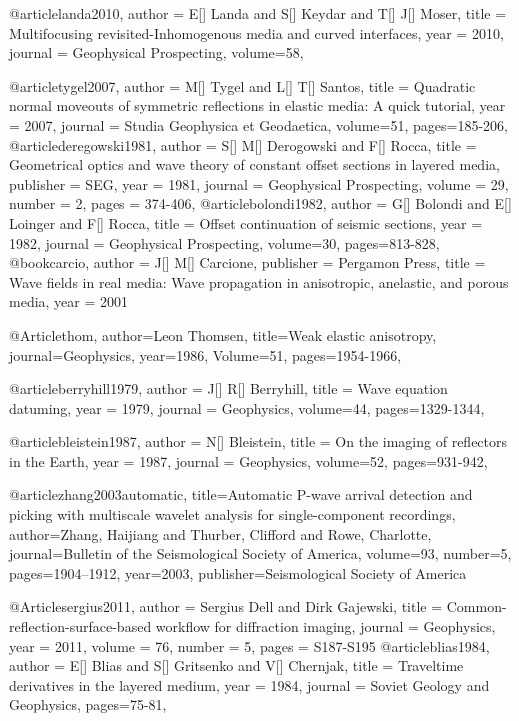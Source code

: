 @article{landa2010,
  author =	 {E[] Landa and S[] Keydar and T[] J[] Moser},
  title =	 {Multifocusing revisited-Inhomogenous media and curved interfaces},
  year =	 2010,
  journal =	 {Geophysical Prospecting},
  volume={58},
}

@article{tygel2007,
  author =	 {M[] Tygel and L[] T[] Santos},
  title =	 {Quadratic normal moveouts of symmetric reflections in elastic media: A quick tutorial},
  year =	 2007,
  journal =	 {Studia Geophysica et Geodaetica},
  volume={51},
 pages=185-206,
}
@article{deregowski1981,
  author =	 {S[] M[] Derogowski and F[] Rocca},
  title =	 {Geometrical optics and wave theory of constant offset sections in layered media},
  publisher =	 {SEG},
  year =	 1981,
  journal =	 {Geophysical Prospecting},
  volume =	 29,
  number =	 2,
  pages =	 {374-406},
}
@article{bolondi1982,
  author =	 {G[] Bolondi and E[] Loinger and F[] Rocca},
  title =	 {Offset continuation of seismic sections},
  year =	 1982,
  journal =	 {Geophysical Prospecting},
  volume={30},
 pages=813-828,
}
@book{carcio,
   author = {J[] M[] Carcione},
   publisher = {Pergamon Press},
   title = {Wave fields in real media: Wave propagation in anisotropic, anelastic, and porous media},
   year = {2001}
}

@Article{thom,
  author={Leon Thomsen},
  title={Weak elastic anisotropy},
  journal={Geophysics},
  year=1986,
  Volume=51,
  pages={1954-1966},
}


@article{berryhill1979,
  author =	 {J[] R[] Berryhill},
  title =	 {Wave equation datuming},
  year =	 1979,
  journal =	 {Geophysics},
  volume={44},
 pages=1329-1344,
}

@article{bleistein1987,
  author =	 {N[] Bleistein},
  title =	 {On the imaging of reflectors in the Earth},
  year =	 1987,
  journal =	 {Geophysics},
  volume={52},
 pages=931-942,
}

@article{zhang2003automatic,
  title={Automatic P-wave arrival detection and picking with multiscale wavelet analysis for single-component recordings},
  author={Zhang, Haijiang and Thurber, Clifford and Rowe, Charlotte},
  journal={Bulletin of the Seismological Society of America},
  volume={93},
  number={5},
  pages={1904--1912},
  year={2003},
  publisher={Seismological Society of America}
}

@Article{sergius2011,
  author =       {Sergius Dell and Dirk Gajewski},
  title =     {Common-reflection-surface-based workflow for diffraction imaging}, 
  journal = {Geophysics},
  year =         2011,
  volume =       76,
  number =       5,
  pages =        {S187-S195}
}
@article{blias1984,
  author =	 {E[] Blias and S[] Gritsenko and V[] Chernjak},
  title =	 {Traveltime derivatives in the layered medium},
  year =	 1984,
  journal =	 {Soviet Geology and Geophysics},
 pages=75-81,
}

